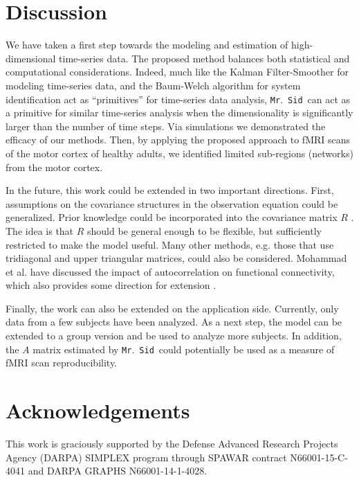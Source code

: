 \documentclass[times,twocolumn,final,authoryear]{elsarticle}
\newcommand{\mrsid}{{\sc \texttt{Mr}.~\texttt{Sid}}}
\begin{document}
\section{Discussion}
We have taken a first step towards the modeling and estimation of high-dimensional time-series data. The proposed method balances both statistical and computational considerations.  Indeed, much like the Kalman Filter-Smoother for modeling time-series data, and the Baum-Welch algorithm for system identification act as ``primitives'' for time-series data analysis, \mrsid~can act as a primitive for similar time-series analysis when the dimensionality is significantly larger than the number of time steps.  Via simulations we demonstrated the efficacy of our methods.  Then, by applying the proposed approach to fMRI scans of the motor cortex of healthy adults, we identified limited sub-regions (networks) from the motor cortex.

In the future, this work could be extended in two important directions. First, assumptions on the covariance structures in the observation equation could be generalized. Prior knowledge could be incorporated into the covariance matrix $R$ \citep{allen2014generalized}. The idea is that $R$ should be general enough to be flexible, but sufficiently restricted to make the model useful. Many other methods, e.g. those that use tridiagonal and upper triangular matrices, could also be considered. Mohammad et al. have discussed the impact of autocorrelation on functional connectivity, which also provides some direction for extension \citep{arbabshirani2014impact}.

Finally, the work can also be extended on the application side. Currently, only data from a few subjects have been analyzed. As a next step, the model can be extended to a group version and be used to analyze more subjects. In addition, the $A$ matrix estimated by \mrsid~could potentially be used as a measure of fMRI scan reproducibility.

\section*{Acknowledgements}
This work is graciously supported by the Defense Advanced Research Projects Agency (DARPA) SIMPLEX program through SPAWAR contract N66001-15-C-4041 and DARPA GRAPHS N66001-14-1-4028.



\end{document}
